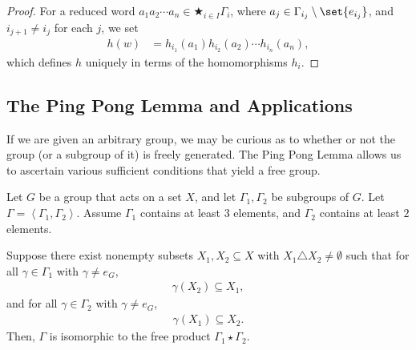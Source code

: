 \begin{proof}
  For a reduced word $a_1a_2\cdots a_n\in \bigstar_{i\in I}\Gamma_i$, where $a_j\in \Gamma_{i_j}\setminus \set{e_{i_j}}$, and $i_{j+1} \neq i_j$ for each $j$, we set
  \begin{align*}
    h\left(w\right) &= h_{i_1}\left(a_1\right)h_{i_2}\left(a_2\right)\cdots h_{i_n}\left(a_n\right),
  \end{align*}
  which defines $h$ uniquely in terms of the homomorphisms $h_{i}$.
\end{proof}
\subsection{The Ping Pong Lemma and Applications}%
If we are given an arbitrary group, we may be curious as to whether or not the group (or a subgroup of it) is freely generated. The Ping Pong Lemma allows us to ascertain various sufficient conditions that yield a free group.
\begin{theorem}\label{thm:ping_pong}
  Let $G$ be a group that acts on a set $X$, and let $\Gamma_1,\Gamma_2$ be subgroups of $G$. Let $\Gamma = \left\langle \Gamma_1,\Gamma_2 \right\rangle$. Assume $\Gamma_1$ contains at least $3$ elements, and $\Gamma_2$ contains at least $2$ elements.\newline

  Suppose there exist nonempty subsets $X_1,X_2\subseteq X$ with $X_1\triangle X_2 \neq \emptyset$ such that for all $\gamma\in \Gamma_1$ with $\gamma \neq e_{G}$,
  \begin{align*}
    \gamma\left(X_2\right)\subseteq X_1,
  \end{align*}
  and for all $\gamma \in \Gamma_2$ with $\gamma \neq e_G$,
  \begin{align*}
    \gamma\left(X_1\right)\subseteq X_2.
  \end{align*}
  Then, $\Gamma$ is isomorphic to the free product $\Gamma_1\star \Gamma_2$.
\end{theorem}
